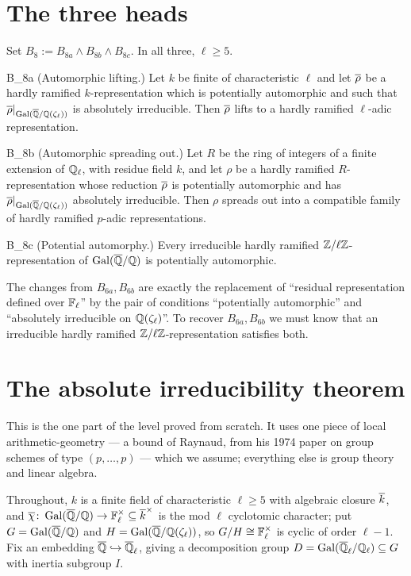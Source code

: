 \documentclass[11pt]{article}
\begin{document}
\section{The three heads}

Set $B_8:=B_{8a}\wedge B_{8b}\wedge B_{8c}$. In all three, $\ell\geq5$.

\begin{Bn}{B_{8a}}
\textup{(Automorphic lifting.)} Let $k$ be finite of characteristic $\ell$ and
let $\overline{\rho}$ be a hardly ramified $k$-representation which is potentially
automorphic and such that $\overline{\rho}|_{\operatorname{Gal}(\overline{\mathbb{Q}}/\mathbb{Q}(\zeta_\ell))}$ is absolutely
irreducible. Then $\overline{\rho}$ lifts to a hardly ramified $\ell$-adic
representation.
\end{Bn}

\begin{Bn}{B_{8b}}
\textup{(Automorphic spreading out.)} Let $R$ be the ring of integers of a
finite extension of $\mathbb{Q}_\ell$, with residue field $k$, and let $\rho$ be a hardly
ramified $R$-representation whose reduction $\overline{\rho}$ is potentially automorphic
and has $\overline{\rho}|_{\operatorname{Gal}(\overline{\mathbb{Q}}/\mathbb{Q}(\zeta_\ell))}$ absolutely irreducible. Then
$\rho$ spreads out into a compatible family of hardly ramified $p$-adic
representations.
\end{Bn}

\begin{Bn}{B_{8c}}
\textup{(Potential automorphy.)} Every irreducible hardly ramified
$\mathbb{Z}/\ell\mathbb{Z}$-representation of $\operatorname{Gal}(\overline{\mathbb{Q}}/\mathbb{Q})$ is potentially automorphic.
\end{Bn}

\noindent
The changes from $B_{6a},B_{6b}$ are exactly the replacement of ``residual
representation defined over $\mathbb{F}_\ell$'' by the pair of conditions ``potentially
automorphic'' and ``absolutely irreducible on $\mathbb{Q}(\zeta_\ell)$''. To recover
$B_{6a},B_{6b}$ we must know that an irreducible hardly ramified
$\mathbb{Z}/\ell\mathbb{Z}$-representation satisfies both.

\section{The absolute irreducibility theorem}

This is the one part of the level proved from scratch. It uses one piece of
local arithmetic-geometry --- a bound of Raynaud, from his 1974 paper on group
schemes of type $(p,\dots,p)$ --- which we assume; everything else is group
theory and linear algebra.

Throughout, $k$ is a finite field of characteristic $\ell\geq5$ with algebraic
closure $\overline{k}$, and $\overline{\chi}\colon\operatorname{Gal}(\overline{\mathbb{Q}}/\mathbb{Q})\to\mathbb{F}_\ell^\times\subseteq\overline{k}^\times$ is the
mod $\ell$ cyclotomic character; put $G=\operatorname{Gal}(\overline{\mathbb{Q}}/\mathbb{Q})$ and $H=\operatorname{Gal}(\overline{\mathbb{Q}}/\mathbb{Q}(\zeta_\ell))$,
so $G/H\cong\mathbb{F}_\ell^\times$ is cyclic of order $\ell-1$. Fix an embedding
$\overline{\mathbb{Q}}\hookrightarrow\overline{\mathbb{Q}}_\ell$, giving a decomposition group $D=\operatorname{Gal}(\overline{\mathbb{Q}}_\ell/\mathbb{Q}_\ell)\subseteq G$
with inertia subgroup $I$.
\end{document}
